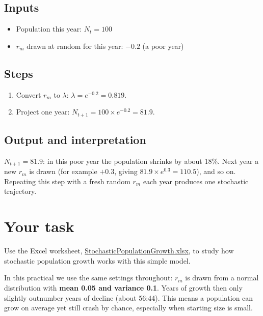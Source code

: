 \documentclass[
  a4paper]{book}
\providecommand{\tightlist}{%
  \setlength{\itemsep}{0pt}\setlength{\parskip}{0pt}}
\begin{document}
\subsection{Inputs}\label{inputs-3}

\begin{itemize}
\tightlist
\item
  Population this year: \(N_t = 100\)
\item
  \(r_m\) drawn at random for this year: \(-0.2\) (a poor year)
\end{itemize}

\subsection{Steps}\label{steps-3}

\begin{enumerate}
\def\labelenumi{\arabic{enumi}.}
\tightlist
\item
  Convert \(r_m\) to \(\lambda\): \(\lambda = e^{-0.2} = 0.819\).
\item
  Project one year: \(N_{t+1} = 100 \times e^{-0.2} = 81.9\).
\end{enumerate}

\subsection{Output and interpretation}\label{output-and-interpretation-3}

\(N_{t+1} = 81.9\): in this poor year the population shrinks by about 18\%. Next year a new \(r_m\) is drawn (for example \(+0.3\), giving \(81.9 \times e^{0.3} = 110.5\)), and so on. Repeating this step with a fresh random \(r_m\) each year produces one stochastic trajectory.

\section{Your task}\label{your-task-4}

Use the Excel worksheet, \href{https://www.dropbox.com/s/1wpixbpgwlh54f0/StochasticPopulationGrowth.xlsx?dl=1}{StochasticPopulationGrowth.xlsx}, to study how stochastic population growth works with this simple model.

In this practical we use the same settings throughout: \(r_m\) is drawn from a normal distribution with \textbf{mean 0.05 and variance 0.1}. Years of growth then only slightly outnumber years of decline (about 56:44). This means a population can grow on average yet still crash by chance, especially when starting size is small.
\end{document}
